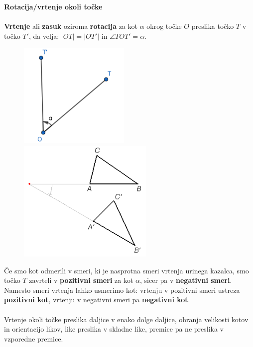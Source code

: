         \begin{frame}
            \large\textbf{Rotacija/vrtenje okoli točke}
            ~\\
            ~\\
            \normalsize
            \textbf{Vrtenje} ali \textbf{zasuk} oziroma \textbf{rotacija} za kot $\alpha$ okrog točke $O$ preslika točko $T$ v točko $T'$, da velja: $\left\lvert OT\right\rvert = \left\lvert OT'\right\rvert$  in $\angle TOT' = \alpha$.


            \begin{figure}
                \includegraphics[scale=0.6]{Slike in skice/Rotacija tocke_okoli_tocke.png}
                \includegraphics[scale=0.6]{Slike in skice/Rotacija_lika_okoli_tocke.png}
            \end{figure}

        \end{frame}

        \begin{frame}
            
            Če smo kot  odmerili v smeri, ki je nasprotna smeri vrtenja urinega kazalca, smo točko $T$ zavrteli v \textbf{pozitivni smeri} za kot $\alpha$, sicer pa v \textbf{negativni smeri}. 
            Namesto smeri vrtenja lahko usmerimo kot: vrtenju v pozitivni smeri ustreza \textbf{pozitivni kot}, vrtenju v negativni smeri pa \textbf{negativni kot}. \\
            ~\\

            Vrtenje okoli točke preslika daljice v enako dolge daljice, ohranja velikosti kotov in orientacijo likov, like preslika v skladne like, premice pa ne preslika v vzporedne premice. 

        \end{frame}



